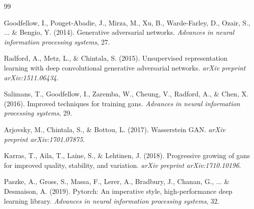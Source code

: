 \documentclass[12pt,a4paper]{article}
\begin{document}

\begin{thebibliography}{99}

 Goodfellow, I., Pouget-Abadie, J., Mirza, M., Xu, B., Warde-Farley, D., Ozair, S., ... \& Bengio, Y. (2014). Generative adversarial networks. \textit{Advances in neural information processing systems}, 27.

 Radford, A., Metz, L., \& Chintala, S. (2015). Unsupervised representation learning with deep convolutional generative adversarial networks. \textit{arXiv preprint arXiv:1511.06434}.

 Salimans, T., Goodfellow, I., Zaremba, W., Cheung, V., Radford, A., \& Chen, X. (2016). Improved techniques for training gans. \textit{Advances in neural information processing systems}, 29.

 Arjovsky, M., Chintala, S., \& Bottou, L. (2017). Wasserstein GAN. \textit{arXiv preprint arXiv:1701.07875}.

 Karras, T., Aila, T., Laine, S., \& Lehtinen, J. (2018). Progressive growing of gans for improved quality, stability, and variation. \textit{arXiv preprint arXiv:1710.10196}.

 Paszke, A., Gross, S., Massa, F., Lerer, A., Bradbury, J., Chanan, G., ... \& Desmaison, A. (2019). Pytorch: An imperative style, high-performance deep learning library. \textit{Advances in neural information processing systems}, 32.

\end{thebibliography}
\end{document}
